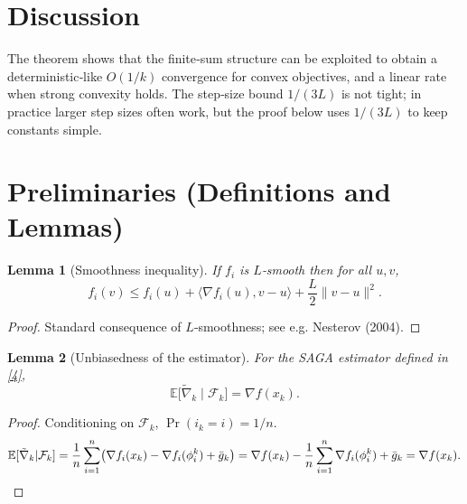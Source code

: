 \documentclass{article}
\newtheorem{lemma}{Lemma}
\newcommand{\E}{\mathbb{E}}
\newcommand{\grad}{\nabla}
\newcommand{\inner}[2]{\langle #1,#2\rangle}
\begin{document}
\section*{Discussion}
The theorem shows that the finite‑sum structure can be exploited to obtain a deterministic‑like $O(1/k)$ convergence for convex objectives, and a linear rate when strong convexity holds. The step‑size bound $1/(3L)$ is not tight; in practice larger step sizes often work, but the proof below uses $1/(3L)$ to keep constants simple.

\newpage
\section*{Preliminaries (Definitions and Lemmas)}
\begin{lemma}[Smoothness inequality]\label{lem:smooth}
If $f_i$ is $L$‑smooth then for all $u,v$,
\[
f_i(v)\le f_i(u)+\inner{\grad f_i(u)}{v-u}+\frac{L}{2}\|v-u\|^2 .
\tag{L1}
\]
\end{lemma}
\begin{proof}
Standard consequence of $L$‑smoothness; see e.g. Nesterov (2004). \qedhere
\end{proof}

\begin{lemma}[Unbiasedness of the estimator]\label{lem:unbiased}
For the SAGA estimator defined in \eqref{4},
\[
\E\bigl[\tilde\nabla_k\mid\mathcal{F}_k\bigr]=\grad f(x_k).
\tag{L2}
\]
\end{lemma}
\begin{proof}
Conditioning on $\mathcal{F}_k$, $\Pr(i_k=i)=1/n$.
\[
\E[\tilde\nabla_k|\mathcal{F}_k]
=\frac1n\sum_{i=1}^{n}\bigl(\grad f_i(x_k)-\grad f_i(\phi_i^k)+\bar g_k\bigr)
=\grad f(x_k)-\frac1n\sum_{i=1}^{n}\grad f_i(\phi_i^k)+\bar g_k
=\grad f(x_k).\qedhere
\]
\end{proof}
\end{document}
